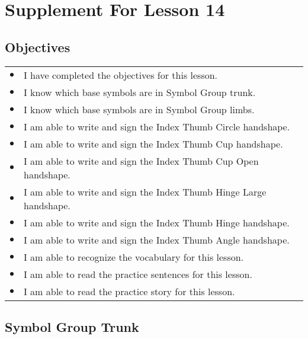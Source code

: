 \documentclass{article}
\begin{document}
\newfontfamily{}
\newfontfamily{}
\newcommand{\bul}{\hfil$\bullet$&}
\renewenvironment{glossary}{\begin{multicols}{5}\begin{center}}{\end{center}\end{multicols}}
\setcounter{secnumdepth}{0}
\setlength{\columnseprule}{1pt}

\section{Supplement For Lesson 14}

\subsection{Objectives}

\begin{tabular}{p{1cm}p{14cm}}
\bul I have completed the objectives for this lesson.\\
\bul I know which base symbols are in Symbol Group trunk.\\
\bul I know which base symbols are in Symbol Group limbs.\\
\bul I am able to write and sign the Index Thumb Circle handshape.\\
\bul I am able to write and sign the Index Thumb Cup handshape.\\
\bul I am able to write and sign the Index Thumb Cup Open handshape.\\
\bul I am able to write and sign the Index Thumb Hinge Large handshape.\\
\bul I am able to write and sign the Index Thumb Hinge handshape.\\
\bul I am able to write and sign the Index Thumb Angle handshape.\\
\bul I am able to recognize the vocabulary for this lesson.\\
\bul I am able to read the practice sentences for this lesson.\\
\bul I am able to read the practice story for this lesson.\\
\end{tabular}

\subsection{Symbol Group Trunk}
\end{document}
